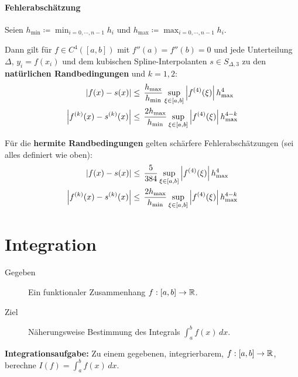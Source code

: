 				\subsubsection{Fehlerabschätzung}
					Seien \( h_\textrm{min} \coloneqq \min_{i = 0, \cdots, n - 1} h_i \) und \( h_\textrm{max} \coloneqq \max_{i = 0, \cdots, n - 1} h_i \).

					Dann gilt für \( f \in C^4([a, b]) \) mit \( f''(a) = f''(b) = 0 \) und jede Unterteilung \( \Delta \), \( y_i = f(x_i) \) und dem kubischen Spline-Interpolanten \( s \in S_{\Delta, 3} \) zu den \textbf{natürlichen Randbedingungen} und \( k = 1, 2 \):
					\begin{align*}
						\abs{f(x) - s(x)}             & \leq\, \frac{h_\textrm{max}}{h_\textrm{min}} \sup_{\xi \in [a, b]} \abs{f^{(4)}(\xi)} \, h_\textrm{max}^4         \\
						\abs{f^{(k)}(x) - s^{(k)}(x)} & \leq\, \frac{2 h_\textrm{max}}{h_\textrm{min}} \sup_{\xi \in [a, b]} \abs{f^{(4)}(\xi)} \, h_\textrm{max}^{4 - k}
					\end{align*}

					Für die \textbf{hermite Randbedingungen} gelten schärfere Fehlerabschätzungen (sei alles definiert wie oben):
					\begin{align*}
						\abs{f(x) - s(x)}             & \leq\, \frac{5}{384} \sup_{\xi \in [a, b]} \abs{f^{(4)}(\xi)} \, h_\textrm{max}^4                                 \\
						\abs{f^{(k)}(x) - s^{(k)}(x)} & \leq\, \frac{2 h_\textrm{max}}{h_\textrm{min}} \sup_{\xi \in [a, b]} \abs{f^{(4)}(\xi)} \, h_\textrm{max}^{4 - k}
					\end{align*}

	\chapter{Integration}
		\label{c:integration}

		\begin{description}
			\item[Gegeben] Ein funktionaler Zusammenhang \( f : [a, b] \rightarrow \mathbb{R} \).
			\item[Ziel] Näherungsweise Bestimmung des Integrals \( \int_{a}^{b} \! f(x) \, dx \).
		\end{description}
		\textbf{Integrationsaufgabe:} Zu einem gegebenen, integrierbarem, \( f : [a, b] \rightarrow \mathbb{R} \), berechne \( I(f) = \int_{a}^{b} \! f(x) \, dx \).

